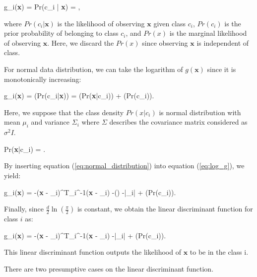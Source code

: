 \be
    \label{eq:prob_x_to_ci}
    g_{i}(\textbf{x}) = Pr(c_{i} | \textbf{x}) = , 
\ee

where $Pr(c_{i} | \textbf{x})$ is the likelihood of observing $\textbf{x}$ given class $c_{i}$, $Pr(c_{i})$ is the prior probability of belonging to class $c_{i}$, and $Pr(x)$ is the marginal likelihood of observing $\textbf{x}$. Here, we discard the $Pr(x)$ since observing $\textbf{x}$ is independent of class.

For normal data distribution, we can take the logarithm of $g(\textbf{x})$ since it is monotonically increasing:

\be
\label{eq:log_g}
g_{i}(\textbf{x}) = \ln(Pr(c_{i}|\textbf{x})) = \ln(Pr(\textbf{x}|c_{i})) + \ln(Pr(c_{i}))\:.
\ee

Here, we suppose that the class density $Pr(x|c_{i})$ is normal distribution with mean $\mu_{i}$ and variance $\Sigma_{i}$ where $\Sigma$ describes the covariance matrix considered as $\sigma^{2}I$.

\be
\label{eq:normal_distribution}
Pr(\textbf{x}|c_{i}) =  \exp {}.
\ee

By inserting equation (\ref{eq:normal_distribution}) into equation (\ref{eq:log_g}), we yield:

\be
\label{eq:prior_linear_disc_func}
g_{i}(\textbf{x}) = -(\textbf{x} - \mu_{i})^{T}{\Sigma_{i}}^{-1}(\textbf{x} - \mu_{i}) -\ln() -\ln|\Sigma_{i}| + \ln(Pr(c_{i}))\:.
\ee

Finally, since $\frac{d}{2}\ln(\frac{\pi}{2})$ is constant, we obtain the linear discriminant function for class $i$ as:

\be
\label{eq:linear_disc_func}
g_{i}(\textbf{x}) = -(\textbf{x} - \mu_{i})^{T}{\Sigma_{i}}^{-1}(\textbf{x} - \mu_{i}) -\ln|\Sigma_{i}| + \ln(Pr(c_{i}))\:.
\ee

This linear discriminant function outputs the likelihood of $\textbf{x}$ to be in the class {i}.

There are two presumptive cases on the linear discriminant function. 

